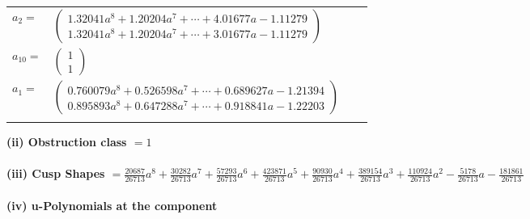 \documentclass[1p]{elsarticle_modified}
\theoremstyle{definition}
\begin{document}
\begin{tabular}{m{7pt} m{180pt} m{7pt} m{180pt} }
\flushright $a_{2}=$&$\begin{pmatrix}1.32041 a^{8}+1.20204 a^{7}+\cdots+4.01677 a-1.11279\\1.32041 a^{8}+1.20204 a^{7}+\cdots+3.01677 a-1.11279\end{pmatrix}$ \\
\flushright $a_{10}=$&$\begin{pmatrix}1\\1\end{pmatrix}$ \\
\flushright $a_{1}=$&$\begin{pmatrix}0.760079 a^{8}+0.526598 a^{7}+\cdots+0.689627 a-1.21394\\0.895893 a^{8}+0.647288 a^{7}+\cdots+0.918841 a-1.22203\end{pmatrix}$\\&\end{tabular}
\flushleft \textbf{(ii) Obstruction class $= 1$}\\~\\
\flushleft \textbf{(iii) Cusp Shapes $= \frac{20687}{26713} a^8+\frac{30282}{26713} a^7+\frac{57293}{26713} a^6+\frac{423871}{26713} a^5+\frac{90930}{26713} a^4+\frac{389154}{26713} a^3+\frac{110924}{26713} a^2-\frac{5178}{26713} a-\frac{181861}{26713}$}\\~\\
\newpage\renewcommand{\arraystretch}{1}
\flushleft \textbf{(iv) u-Polynomials at the component}\newline \\
\end{document}
